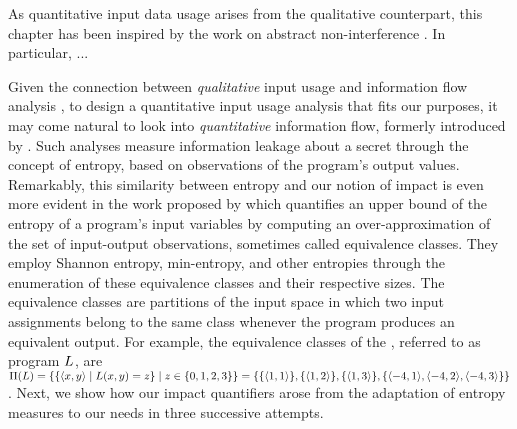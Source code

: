 As quantitative input data usage arises from the qualitative counterpart, this chapter has been inspired by the work on abstract non-interference . In particular, \textcite{Giacobazzi2004} ...

Given the connection between \emph{qualitative} input usage and information flow analysis , to design a quantitative input usage analysis that fits our purposes, it may come natural to look into \emph{quantitative} information flow, formerly introduced by .
Such analyses measure information leakage about a secret through the concept of entropy, based on observations of the program's output values.
%
Remarkably, this similarity between entropy and our notion of impact is even more evident
in the work proposed by  which quantifies an upper bound of the entropy of a program's input variables by computing an over-approximation of the set of input-output observations, sometimes called equivalence classes. They employ Shannon entropy, min-entropy, and other entropies through the enumeration of these equivalence classes and their respective sizes. The equivalence classes are partitions of the input space in which two input assignments belong to the same class whenever the program produces an equivalent output.
For example, the equivalence classes of the , referred to as program $\landingprogram$, are $\entropypartitions[\landingprogram]=\setdef{\setdef{\tuple{x}{y}}{\landingprogram(x, y)=\defoutput}}{\defoutput\in\{0, 1, 2, 3\}}
=\{\{\tuple{1}{1}\}, \{\tuple{1}{2}\}, \{\tuple{1}{3}\}, \{\tuple{-4}{1}, \tuple{-4}{2}, \tuple{-4}{3}\}\}$.
Next, we show how our impact quantifiers arose from the adaptation of entropy measures to our needs in three successive attempts.


